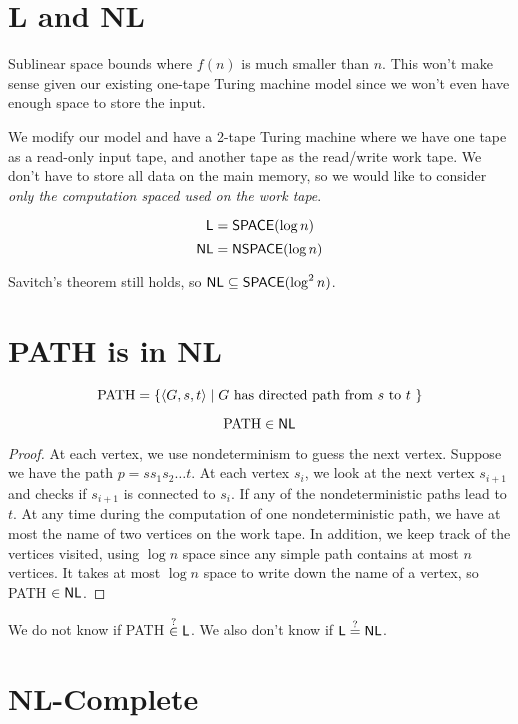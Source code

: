 \section{L and NL}

Sublinear space bounds where $f(n)$ is much smaller than $n$. This won't make sense given our existing one-tape Turing machine model since we won't even have enough space to store the input.

We modify our model and have a 2-tape Turing machine where we have one tape as a read-only input tape, and another tape as the read/write work tape. We don't have to store all data on the main memory, so we would like to consider \textit{only the computation spaced used on the work tape}.

$$
\mathsf{L} = \mathsf{SPACE}(\log n)
$$
$$
\mathsf{NL} = \mathsf{NSPACE}(\log n)
$$

Savitch's theorem still holds, so $\mathsf{NL} \subseteq \mathsf{SPACE}(\log^2 n)$.

\section{PATH is in NL}

$$
\text{PATH} = \{ \langle G,s,t \rangle \mid \text{$G$ has directed path from $s$ to $t$ } \}
$$

\begin{theorem}[PATH in NL]
    $$
    \text{PATH} \in \mathsf{NL}
    $$
\end{theorem}

\begin{proof}
    At each vertex, we use nondeterminism to guess the next vertex. Suppose we have the path $p = s s_1 s_2 \ldots t$. At each vertex $s_i$, we look at the next vertex $s_{i+1}$ and checks if $s_{i+1}$ is connected to $s_i$. If any of the nondeterministic paths lead to $t$. At any time during the computation of one nondeterministic path, we have at most the name of two vertices on the work tape. In addition, we keep track of the vertices visited, using $\log n$ space since any simple path contains at most $n$ vertices. It takes at most $\log n$ space to write down the name of a vertex, so PATH $\in \mathsf{NL}$.
\end{proof}

We do not know if PATH $\overset{?}{\in} \mathsf{L}$. We also don't know if $\mathsf{L} \overset{?}{=} \mathsf{NL}$.

\section{NL-Complete}

